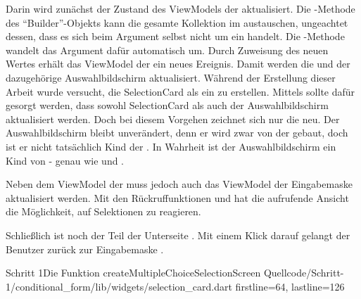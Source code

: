 Darin wird zunächst der Zustand des ViewModels der  aktualisiert.
Die -Methode des \enquote{Builder}-Objekts kann die gesamte Kollektion im  austauschen, ungeachtet dessen, dass es sich beim Argument selbst nicht um ein  handelt.
Die -Methode wandelt das Argument dafür automatisch um.
Durch Zuweisung des neuen Wertes erhält das ViewModel der  ein neues Ereignis.
Damit werden die  und der dazugehörige Auswahlbildschirm aktualisiert.
Während der Erstellung dieser Arbeit wurde versucht, die SelectionCard als ein  zu erstellen.
Mittels  sollte dafür gesorgt werden, dass sowohl SelectionCard als auch der Auswahlbildschirm aktualisiert werden.
Doch bei diesem Vorgehen zeichnet sich nur die  neu.
Der Auswahlbildschirm bleibt unverändert, denn er wird zwar von der  gebaut, doch ist er nicht tatsächlich Kind der .
In Wahrheit ist der Auswahlbildschirm ein Kind von  - genau wie  und .

Neben dem ViewModel der  muss jedoch auch das ViewModel der Eingabemaske aktualisiert werden.
Mit den Rückruffunktionen   und   hat die aufrufende Ansicht die Möglichkeit, auf Selektionen zu reagieren.

Schließlich ist noch der  Teil der Unterseite .
Mit einem Klick darauf gelangt der Benutzer zurück zur Eingabemaske .


\begin{alexlisting}{Schritt 1}{Die Funktion createMultipleChoiceSelectionScreen}
  {Quellcode/Schritt-1/conditional_form/lib/widgets/selection_card.dart}
  {firstline=64, lastline=126}
  \label{lst:Schritt1FunktionCreateMultipleChoiceSelectionScreen}
\end{alexlisting}
 
 
\ifIncludeFigures \clearpage \fi